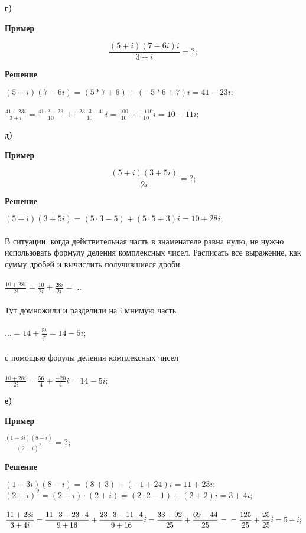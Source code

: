 \documentclass[12pt]{article}
\begin{document}
\newpage
\textbf{г)}\\
\begin{center}\textbf{Пример}\end{center}
$$
\frac{(5+i)(7-6i)i}{3+i} = ?;
$$
\begin{center}\textbf{Решение}\end{center}
$(5+i)(7-6i)=(5*7+6)+(-5*6+7)i=41-23i;$\\
\\
$
\displaystyle
\frac{41-23i}{3+i}=
\frac{41\cdot3-23}{10}+\frac{-23\cdot3-41}{10}i=
\frac{100}{10}+\frac{-110}{10}i=
10-11i;
$

\newpage

\textbf{д)}\\
\begin{center}\textbf{Пример}\end{center}
$$
\frac{(5+i)(3+5i)}{2i}=?;
$$
\begin{center}\textbf{Решение}\end{center}
$(5+i)(3+5i)=(5\cdot3-5)+(5\cdot5 + 3)i=10+28i;$\\
\\
В ситуации, когда действительная часть в знаменателе равна нулю,
не нужно использовать формулу деления комплексных чисел.
Расписать все выражение, как сумму дробей и вычислить получившиеся дроби.\\
\\
$
\displaystyle
\frac{10+28i}{2i}=
\frac{10}{2i}+
\frac{28i}{2i}=...
$\\
\\
Тут домножили и разделили на i мнимую часть\\
\\
$ 
\displaystyle
...=14 + \frac{5i}{i^2} = 14-5i;
$\\
\\
с помощью форулы деления комплексных чисел\\
\\
$
\displaystyle
\frac{10+28i}{2i}=
\frac{56}{4}+
\frac{-20}{4}i=
14-5i;
$


\newpage
\textbf{е)}\\
\begin{center}\textbf{Пример}\end{center}
$
\displaystyle
\frac{(1+3i)(8-i)}{(2+i)^2}=?;
$\\
\begin{center}\textbf{Решение}\end{center}
$
(1+3i)(8-i)=(8+3)+(-1+24)i=11+23i;
$\\
$
(2+i)^2=(2+i)\cdot(2+i)=(2\cdot2-1)+(2+2)i=3+4i;
$\\
\\
$
\displaystyle
\frac{11+23i}{3+4i}=
\frac{11\cdot3+23\cdot4}{9+16}+
\frac{23\cdot3-11\cdot4}{9+16}i=
\frac{33+92}{25}+
\frac{69-44}{25}=\\
=\frac{125}{25}+
\frac{25}{25}i=5+i;
$\\
\end{document}
